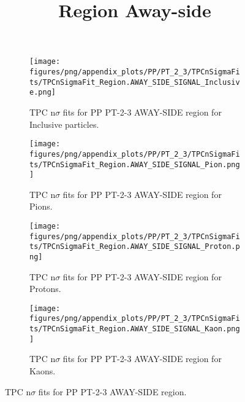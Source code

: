             \begin{figure}[H]
                \title{Region Away-side}
                \begin{subfigure}[b]{0.5\textwidth}
                    \centering
                    \texttt{[image: figures/png/appendix\_plots/PP/PT\_2\_3/TPCnSigmaFits/TPCnSigmaFit\_Region.AWAY\_SIDE\_SIGNAL\_Inclusive.png]}
                    \caption{TPC n$\sigma$ fits for PP PT-2-3 AWAY-SIDE region for Inclusive particles.}
                    \label{fig:appendix_PP_PT-2-3_AWAY_SIDE_SIGNAL_Inclusive}
                \end{subfigure}
                \begin{subfigure}[b]{0.5\textwidth}
                    \centering
                    \texttt{[image: figures/png/appendix\_plots/PP/PT\_2\_3/TPCnSigmaFits/TPCnSigmaFit\_Region.AWAY\_SIDE\_SIGNAL\_Pion.png]}
                    \caption{TPC n$\sigma$ fits for PP PT-2-3 AWAY-SIDE region for Pions.}
                    \label{fig:appendix_PP_PT-2-3_AWAY_SIDE_SIGNAL_Pion}
                \end{subfigure}
                \begin{subfigure}[b]{0.5\textwidth}
                    \centering
                    \texttt{[image: figures/png/appendix\_plots/PP/PT\_2\_3/TPCnSigmaFits/TPCnSigmaFit\_Region.AWAY\_SIDE\_SIGNAL\_Proton.png]}
                    \caption{TPC n$\sigma$ fits for PP PT-2-3 AWAY-SIDE region for Protons.}
                    \label{fig:appendix_PP_PT-2-3_AWAY_SIDE_SIGNAL_Proton}
                \end{subfigure}
                \begin{subfigure}[b]{0.5\textwidth}
                    \centering
                    \texttt{[image: figures/png/appendix\_plots/PP/PT\_2\_3/TPCnSigmaFits/TPCnSigmaFit\_Region.AWAY\_SIDE\_SIGNAL\_Kaon.png]}
                    \caption{TPC n$\sigma$ fits for PP PT-2-3 AWAY-SIDE region for Kaons.}
                    \label{fig:appendix_PP_PT-2-3_AWAY_SIDE_SIGNAL_Kaon}
                \end{subfigure}
                \caption{TPC n$\sigma$ fits for PP PT-2-3 AWAY-SIDE region.}
                \label{fig:appendix_PP_PT-2-3_AWAY_SIDE_SIGNAL}
            \end{figure}
